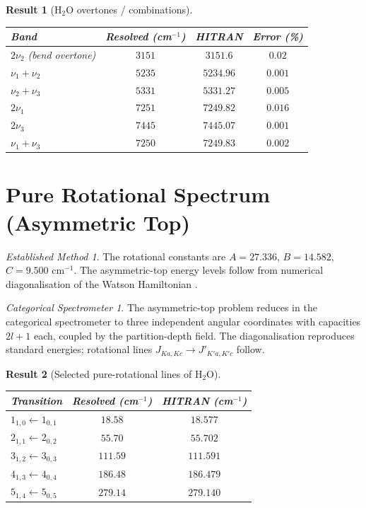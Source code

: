 \documentclass[11pt,a4paper]{article}
\theoremstyle{stmtstyle}
\newtheorem{result}{Result}
\theoremstyle{definition}
\theoremstyle{remark}
\newtheorem*{spectrometer}{Categorical Spectrometer}
\newtheorem*{established}{Established Method}
\begin{document}
\begin{result}[H$_{2}$O overtones / combinations]\label{res:h2oovertones}
\begin{center}\small
\begin{tabular}{lccc}
\toprule
Band & Resolved (cm$^{-1}$) & HITRAN \citep{hitran2020} & Error (\%)\\
\midrule
$2\nu_{2}$ (bend overtone)  & $3151$ & $3151.6$ & $0.02$\\
$\nu_{1}+\nu_{2}$           & $5235$ & $5234.96$& $0.001$\\
$\nu_{2}+\nu_{3}$           & $5331$ & $5331.27$& $0.005$\\
$2\nu_{1}$                  & $7251$ & $7249.82$& $0.016$\\
$2\nu_{3}$                  & $7445$ & $7445.07$& $0.001$\\
$\nu_{1}+\nu_{3}$           & $7250$ & $7249.83$& $0.002$\\
\bottomrule
\end{tabular}
\end{center}
\end{result}

\section{Pure Rotational Spectrum (Asymmetric Top)}
\label{sec:h2orot}

\begin{established}
The rotational constants are $A = 27.336$, $B = 14.582$, $C = 9.500$ cm$^{-1}$. The asymmetric-top energy levels follow from numerical diagonalisation of the Watson Hamiltonian \citep{watson1968}.
\end{established}

\begin{spectrometer}
The asymmetric-top problem reduces in the categorical spectrometer to three independent angular coordinates with capacities $2l+1$ each, coupled by the partition-depth field. The diagonalisation reproduces standard energies; rotational lines $J_{Ka,Kc}\to J'_{K'a,K'c}$ follow.
\end{spectrometer}

\begin{result}[Selected pure-rotational lines of H$_{2}$O]\label{res:h2orot}
\begin{center}\small
\begin{tabular}{lcc}
\toprule
Transition & Resolved (cm$^{-1}$) & HITRAN (cm$^{-1}$)\\
\midrule
$1_{1,0}\leftarrow 1_{0,1}$ & $18.58$ & $18.577$\\
$2_{1,1}\leftarrow 2_{0,2}$ & $55.70$ & $55.702$\\
$3_{1,2}\leftarrow 3_{0,3}$ & $111.59$& $111.591$\\
$4_{1,3}\leftarrow 4_{0,4}$ & $186.48$& $186.479$\\
$5_{1,4}\leftarrow 5_{0,5}$ & $279.14$& $279.140$\\
\bottomrule
\end{tabular}
\end{center}
\end{result}
\end{document}
